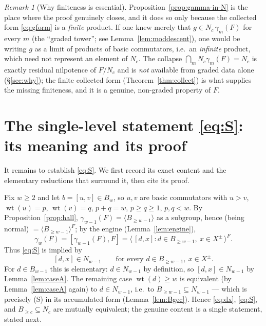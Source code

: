 \documentclass{amsart}
\theoremstyle{definition}
\theoremstyle{remark}
\newtheorem{remark}{Remark}
\begin{document}
\begin{remark}[Why finiteness is essential]\label{rem:finite}
Proposition~\ref{prop:gamma-in-N} is the place where the proof genuinely closes,
and it does so only because the collected form \eqref{eq:gform} is a
\emph{finite} product. If one knew merely that $g\in N_c\,\gamma_m(F)$ for every
$m$ (the ``graded tower''; see Lemma~\ref{lem:moddescent}), one would be writing
$g$ as a limit of products of basic commutators, i.e.\ an \emph{infinite} product,
which need not represent an element of $N_c$. The collapse
$\bigcap_m N_c\gamma_m(F)=N_c$ is exactly residual nilpotence of $F/N_c$ and is
\emph{not} available from graded data alone (\S\ref{sec:why}); the finite collected
form (Theorem~\ref{thm:collect}) is what supplies the missing finiteness, and it
is a genuine, non-graded property of $F$.
\end{remark}

\section{The single-level statement \eqref{eq:S}: its meaning and its proof}
\label{sec:S}

It remains to establish \eqref{eq:S}. We first record its exact content and the
elementary reductions that surround it, then cite its proof.

Fix $w\ge2$ and let $b=[u,v]\in B_w$, so $u,v$ are basic commutators with $u>v$,
$\operatorname{wt}(u)=p$, $\operatorname{wt}(v)=q$, $p+q=w$, $p\ge q\ge1$,
$p,q<w$. By Proposition~\ref{prop:hall}, $\gamma_{w-1}(F)=\langle
B_{\ge w-1}\rangle$ as a subgroup, hence (being normal) $=\langle
B_{\ge w-1}\rangle^{F}$; by the engine (Lemma~\ref{lem:engine}),
\begin{equation}\label{eq:gw-gen}
\gamma_w(F)=[\gamma_{w-1}(F),F]
=\big\langle\,[d,x] : d\in B_{\ge w-1},\ x\in X^{\pm}\,\big\rangle^{F}.
\end{equation}
Thus \eqref{eq:S} is implied by
\begin{equation}\label{eq:dx}
[d,x]\in N_{w-1}\qquad\text{for every }d\in B_{\ge w-1},\ x\in X^{\pm}.
\end{equation}
For $d\in B_{w-1}$ this is elementary: $d\in N_{w-1}$ by definition, so
$[d,x]\in N_{w-1}$ by Lemma~\ref{lem:caseA}. The remaining case
$\operatorname{wt}(d)\ge w$ is equivalent (by Lemma~\ref{lem:caseA} again) to
$d\in N_{w-1}$, i.e.\ to $B_{\ge w-1}\subseteq N_{w-1}$ --- which is precisely (S)
in its accumulated form (Lemma~\ref{lem:Bgec}). Hence \eqref{eq:dx},
\eqref{eq:S}, and $B_{\ge c}\subseteq N_c$ are mutually equivalent; the genuine
content is a single statement, stated next.
\end{document}
